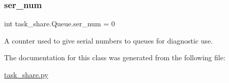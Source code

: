 \subsubsection{\texorpdfstring{ser\_num}{ser\_num}}
{\footnotesize\ttfamily int task\+\_\+share.\+Queue.\+ser\+\_\+num = 0\hspace{0.3cm}{\ttfamily [static]}}



A counter used to give serial numbers to queues for diagnostic use. 



The documentation for this class was generated from the following file\+:\begin{DoxyCompactItemize}
\item 
\mbox{\hyperlink{task__share_8py}{task\+\_\+share.\+py}}\end{DoxyCompactItemize}
